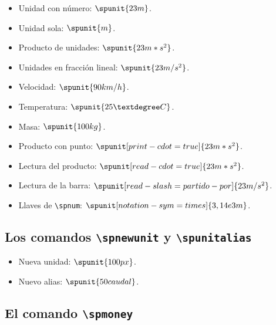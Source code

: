\documentclass{article}
\begin{document}
\begin{itemize}
  \item Unidad con número: $\spunit{23 m}$.
  \item Unidad sola: $\spunit{m}$.
  \item Producto de unidades: $\spunit{23 m*s^{2}}$.
  \item Unidades en fracción lineal: $\spunit{23 m/s^{2}}$.
  \item Velocidad: $\spunit{90 km/h}$.
  \item Temperatura: $\spunit{25 °C}$.
  \item Masa: $\spunit{100 kg}$.
  \item Producto con punto: $\spunit[print-cdot=true]{23 m*s^{2}}$.
  \item Lectura del producto: $\spunit[read-cdot=true]{23 m*s^{2}}$.
  \item Lectura de la barra: $\spunit[read-slash=partido-por]{23 m/s^{2}}$.
  \item Llaves de \texttt{\textbackslash spnum}: $\spunit[notation-sym=times]{3,14e3 m}$.
\end{itemize}

\subsection*{Los comandos \texttt{\textbackslash spnewunit} y \texttt{\textbackslash spunitalias}}


\begin{itemize}
  \item Nueva unidad: $\spunit{100 px}$.
  \item Nuevo alias: $\spunit{50 caudal}$.
\end{itemize}

\subsection*{El comando \texttt{\textbackslash spmoney}}
\end{document}
